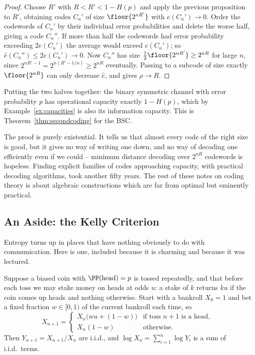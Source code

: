 \begin{proof}
	Choose $R'$ with $R<R'<1-H(p)$ and apply the previous proposition to $R'$, obtaining codes $C_n'$ of size $\floor{2^{nR'}}$ with $e(C_n')\to0$. Order the codewords of $C_n'$ by their individual error probabilities and delete the worse half, giving a code $C_n''$. If more than half the codewords had error probability exceeding $2e(C_n')$ the average would exceed $e(C_n')$; so $\hat e(C_n'')\le 2e(C_n')\to0$. Now $C_n''$ has size $\tfrac12\floor{2^{nR'}} \ge 2^{nR}$ for large $n$, since $2^{nR'-1} = 2^{n(R'-1/n)} \ge 2^{nR}$ eventually. Passing to a subcode of size exactly $\floor{2^{nR}}$ can only decrease $\hat e$, and gives $\rho \to R$.
\end{proof}

Putting the two halves together: the binary symmetric channel with error probability $p$ has operational capacity exactly $1 - H(p)$, which by Example~\ref{ex:capacities} is also its information capacity. This is Theorem~\ref{thm:secondcoding} for the BSC.

\begin{remark}
	The proof is purely existential. It tells us that almost every code of the right size is good, but it gives no way of writing one down, and no way of decoding one efficiently even if we could -- minimum distance decoding over $2^{nR}$ codewords is hopeless. Finding explicit families of codes approaching capacity, with practical decoding algorithms, took another fifty years. The rest of these notes on coding theory is about algebraic constructions which are far from optimal but eminently practical.
\end{remark}

\subsection{An Aside: the Kelly Criterion}

Entropy turns up in places that have nothing obviously to do with communication. Here is one, included because it is charming and because it was lectured.

Suppose a biased coin with $\PP(\text{head}) = p$ is tossed repeatedly, and that before each toss we may stake money on heads at odds $u$: a stake of $k$ returns $ku$ if the coin comes up heads and nothing otherwise. Start with a bankroll $X_0 = 1$ and bet a fixed fraction $w \in [0,1)$ of the current bankroll each time, so
$$X_{n+1} = \begin{cases} X_n\bigl(wu + (1-w)\bigr) & \text{if toss } n+1 \text{ is a head},\\ X_n(1-w) & \text{otherwise.}\end{cases}$$
Then $Y_{n+1} = X_{n+1}/X_n$ are i.i.d., and $\log X_n = \sum_{i=1}^n \log Y_i$ is a sum of i.i.d.\ terms.


